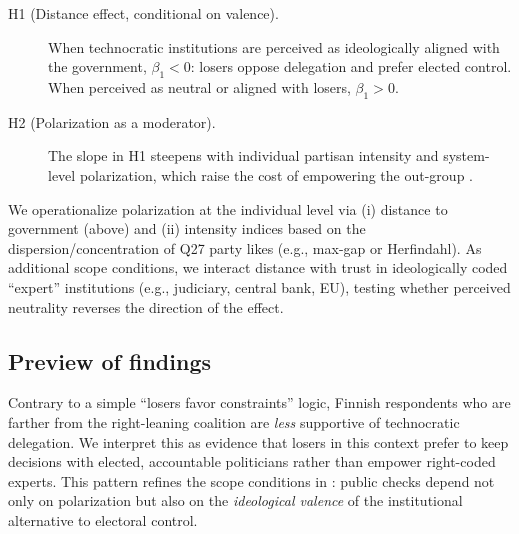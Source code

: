 \begin{description}
  \item[H1 (Distance effect, conditional on valence).] When technocratic institutions are perceived as ideologically aligned with the government, $\beta_1<0$: losers oppose delegation and prefer elected control. When perceived as neutral or aligned with losers, $\beta_1>0$.
  \item[H2 (Polarization as a moderator).] The slope in H1 steepens with individual partisan intensity and system-level polarization, which raise the cost of empowering the out-group \citep{Svolik2019JoD, Sartori1976}.
\end{description}

\noindent
We operationalize polarization at the individual level via (i) distance to government (above) and (ii) intensity indices based on the dispersion/concentration of Q27 party likes (e.g., max-gap or Herfindahl). As additional scope conditions, we interact distance with trust in ideologically coded “expert” institutions (e.g., judiciary, central bank, EU), testing whether perceived neutrality reverses the direction of the effect.

\subsection*{Preview of findings}

Contrary to a simple “losers favor constraints” logic, Finnish respondents who are farther from the right-leaning coalition are \emph{less} supportive of technocratic delegation. We interpret this as evidence that losers in this context prefer to keep decisions with elected, accountable politicians rather than empower right-coded experts. This pattern refines the scope conditions in \citet{Svolik2020QJPS}: public checks depend not only on polarization but also on the \emph{ideological valence} of the institutional alternative to electoral control.

% 